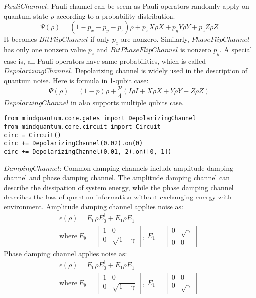 $Pauli Channel$: Pauli channel can be seem as Pauli operators randomly apply on quantum state $\rho$ according to a probability distribution.
\begin{equation}
    \Psi(\rho) = (1-p_x-p_y-p_z) \rho + p_x X \rho X + p_y Y \rho Y + p_z Z \rho Z
\end{equation}
It becomes $BitFlipChannel$ if only $p_x$ are nonzero. Similarly, $PhaseFlipChannel$ has only one nonzero value $p_z$ and $BitPhaseFlipChannel$ is nonzero $p_y$. A special case is, all Pauli operators have same probabilities, which is called $DepolarizingChannel$. Depolarizing channel is widely used in the description of quantum noise. Here is formula in 1-qubit case:
\begin{equation}
    \Psi(\rho) =  (1-p) \rho + \frac{p}{4}(I\rho I+X\rho X+Y\rho Y+Z\rho Z)
\end{equation}
$Depolarzing Channel$ in \MindQuantum also supports multiple qubits case.
\begin{lstlisting}
from mindquantum.core.gates import DepolarizingChannel
from mindquantum.core.circuit import Circuit
circ = Circuit()
circ += DepolarizingChannel(0.02).on(0)
circ += DepolarizingChannel(0.01, 2).on([0, 1])
\end{lstlisting}
$Damping Channel$: Common damping channels include amplitude damping channel and phase damping channel. The amplitude damping channel can describe the dissipation of system energy, while the phase damping channel describes the loss of quantum information without exchanging energy with environment.
Amplitude damping channel applies noise as:
\begin{gather*}
    \epsilon(\rho) = E_0 \rho E_0^\dagger + E_1 \rho E_1^\dagger
    \\
    \text{where}\ {E_0}=\begin{bmatrix}1&0\\
            0&\sqrt{1-\gamma}\end{bmatrix},
        \ {E_1}=\begin{bmatrix}0&\sqrt{\gamma}\\
            0&0\end{bmatrix}
\end{gather*}
Phase damping channel applies noise as:
\begin{gather*}
    \epsilon(\rho) = E_0 \rho E_0^\dagger + E_1 \rho E_1^\dagger
    \\
    \text{where}\ {E_0}=\begin{bmatrix}1&0\\
            0&\sqrt{1-\gamma}\end{bmatrix},
        \ {E_1}=\begin{bmatrix}0&0\\
            0&\sqrt{\gamma}\end{bmatrix}
\end{gather*}
